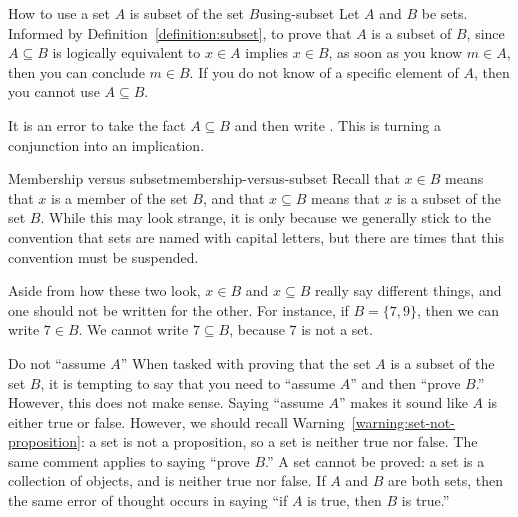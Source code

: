 \documentclass{book}
\theoremstyle{ekimcustom}
\begin{document}
\begin{bmethod}{How to use a set $A$ is subset of the set $B$}{using-subset}
Let $A$ and $B$ be sets. Informed by Definition~\ref{definition:subset}, to prove that $A$ is a subset of $B$, since $A \subseteq B$ is logically equivalent to $x \in A$ implies $x \in B$, as soon as you know $m \in A$, then you can conclude $m \in B$. If you do not know of a specific element of $A$, then you cannot use $A \subseteq B$.
\end{bmethod}
\begin{bwarning}{}{}
It is an error to take the fact $A \subseteq B$ and then write . This is turning a conjunction into an implication.
\end{bwarning}

\begin{bwarning}{Membership versus subset}{membership-versus-subset}
Recall that $x \in B$ means that $x$ is a member of the set $B$, and that $x \subseteq B$ means that $x$ is a subset of the set $B$. While this may look strange, it is only because we generally stick to the convention that sets are named with capital letters, but there are times that this convention must be suspended.

Aside from how these two look, $x \in B$ and $x \subseteq B$ really say different things, and one should not be written for the other. For instance, if $B = \{7,9\}$, then we can write $7 \in B$. We cannot write $7 \subseteq B$, because $7$ is not a set.
\end{bwarning}

\begin{bwarning}{Do not ``assume $A$''}{}
When tasked with proving that the set $A$ is a subset of the set $B$, it is tempting to say that you need to ``assume $A$'' and then ``prove $B$.'' However, this does not make sense. Saying ``assume $A$'' makes it sound like $A$ is either true or false. However, we should recall Warning~\ref{warning:set-not-proposition}: a set is not a proposition, so a set is neither true nor false. The same comment applies to saying ``prove $B$.'' A set cannot be proved: a set is a collection of objects, and is neither true nor false. If $A$ and $B$ are both sets, then the same error of thought occurs in saying ``if $A$ is true, then $B$ is true.''
\end{bwarning}
\end{document}
